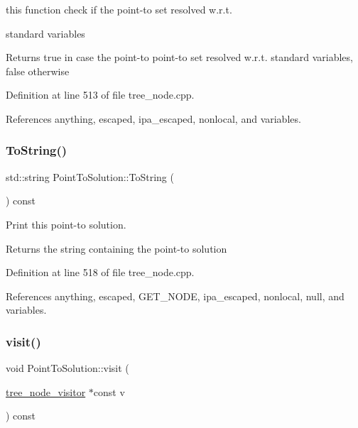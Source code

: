 this function check if the point-\/to set resolved w.\+r.\+t. 

standard variables \begin{DoxyReturn}{Returns}
true in case the point-\/to point-\/to set resolved w.\+r.\+t. standard variables, false otherwise 
\end{DoxyReturn}


Definition at line 513 of file tree\+\_\+node.\+cpp.



References anything, escaped, ipa\+\_\+escaped, nonlocal, and variables.

\mbox{\label{structPointToSolution_aeba7648bc2e0bd50c597fefbb2534399}} 
\subsubsection{\texorpdfstring{To\+String()}{ToString()}}
{\footnotesize\ttfamily std\+::string Point\+To\+Solution\+::\+To\+String (\begin{DoxyParamCaption}{ }\end{DoxyParamCaption}) const}



Print this point-\/to solution. 

\begin{DoxyReturn}{Returns}
the string containing the point-\/to solution 
\end{DoxyReturn}


Definition at line 518 of file tree\+\_\+node.\+cpp.



References anything, escaped, G\+E\+T\+\_\+\+N\+O\+DE, ipa\+\_\+escaped, nonlocal, null, and variables.

\mbox{\label{structPointToSolution_afc598575443b8e2e105d17ea84d0de01}} 
\subsubsection{\texorpdfstring{visit()}{visit()}}
{\footnotesize\ttfamily void Point\+To\+Solution\+::visit (\begin{DoxyParamCaption}\item[{\hyperlink{classtree__node__visitor}{tree\+\_\+node\+\_\+visitor} $\ast$const}]{v }\end{DoxyParamCaption}) const\hspace{0.3cm}{\ttfamily [virtual]}}



